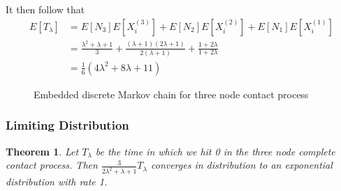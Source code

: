 \documentclass{article}
\theoremstyle{plain}
\newtheorem{theorem}{Theorem}[section]
\theoremstyle{definition}
\theoremstyle{remark}
\begin{document}
It then follow that
\begin{align*}
        E[T_\lambda] &= E[N_3] E[X_i^{(3)}] + E[N_2] E[X_i^{(2)}] + E[N_1] E[X_i^{(1)}]\\
        &= \frac{\lambda^2 + \lambda + 1}{3} + \frac{(\lambda + 1)(2 \lambda + 1)}{2 (\lambda + 1)} + \frac{1 + 2\lambda}{1 + 2 \lambda}\\
        &= \frac{1}{6}(4 \lambda^2 + 8 \lambda + 11)
\end{align*}

\begin{figure}
    \centering
    \caption{Embedded discrete Markov chain for three node contact process}
    \label{fig:discrete_mc_three_contact}
\end{figure}

\subsubsection{Limiting Distribution}
\begin{theorem}
Let $T_\lambda$ be the time in which we hit 0 in the three node complete contact process.
Then $\frac{3}{2 \lambda^2 + \lambda + 1} T_\lambda$ converges in distribution to an exponential distribution with rate 1.
\end{theorem}
\end{document}
